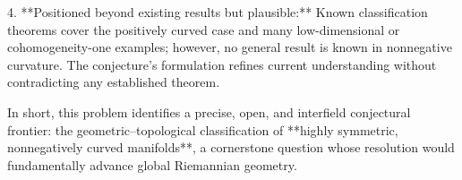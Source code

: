 4. **Positioned beyond existing results but plausible:**  
   Known classification theorems cover the positively curved case and many low-dimensional or cohomogeneity-one examples; however, no general result is known in nonnegative curvature. The conjecture’s formulation refines current understanding without contradicting any established theorem.

In short, this problem identifies a precise, open, and interfield conjectural frontier: the geometric–topological classification of **highly symmetric, nonnegatively curved manifolds**, a cornerstone question whose resolution would fundamentally advance global Riemannian geometry.